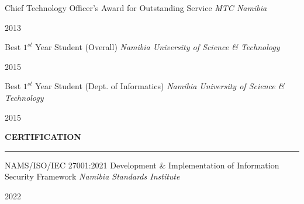 \documentclass[
  letterpaper,
  DIV=11,
  numbers=noendperiod]{scrartcl}
\begin{document}
\begin{large}
  \begin{multicols}{2}
    \begin{flushleft}
      Chief Technology Officer’s Award for Outstanding Service
      \textit{MTC Namibia}
    \end{flushleft}
    \begin{flushright}2013\end{flushright}
  \end{multicols}
  \vspace{-0.2cm}
\end{large}

\vspace{5pt}

\begin{large}
  \begin{multicols}{2}
    \begin{flushleft}
      Best $1^{st}$ Year Student (Overall)
      \textit{Namibia University of Science \& Technology}
    \end{flushleft}
    \begin{flushright}2015\end{flushright}
  \end{multicols}
  \vspace{-0.2cm}
\end{large}

\vspace{5pt}

\begin{large}
  \begin{multicols}{2}
    \begin{flushleft}
      Best $1^{st}$ Year Student (Dept. of Informatics)
      \textit{Namibia University of Science \& Technology}
    \end{flushleft}
    \begin{flushright}2015\end{flushright}
  \end{multicols}
  \vspace{-0.2cm}
\end{large}

\vspace{7pt}

\setlength{\columnsep}{-15.5cm}

\begin{large}
{\bf CERTIFICATION}
  \vspace{3pt}
  \hrule
  \begin{multicols}{2}
    \begin{flushleft}
      NAMS/ISO/IEC 27001:2021 Development \& Implementation of Information Security Framework
      \textit{Namibia Standards Institute}
    \end{flushleft}
    \begin{flushright}2022\end{flushright}
  \end{multicols}
\end{large}
\end{document}
